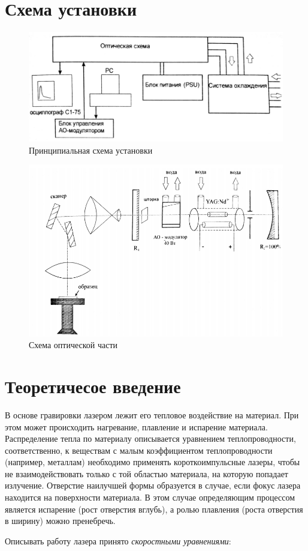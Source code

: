 \documentclass[a4paper, 12pt]{article}
\begin{document}
	\section{Схема установки}
	\begin{figure}[h!]
	\begin{center}
		\includegraphics[scale = 0.4]{sch1}
		\caption{Принципиальная схема установки}
		\label{ris:shem1}
	\end{center}	
	\end{figure}
	\begin{figure}[h!]
	\begin{center}
		\includegraphics[scale = 0.44]{sch2}
		\caption{Схема оптической части}
		\label{ris:shem2}
	\end{center}	
	\end{figure}
	\section{Теоретичесое введение}
	
	В основе гравировки лазером лежит его тепловое воздействие на материал. При этом может происходить нагревание, плавление и испарение материала. Распределение тепла по материалу описывается уравнением теплопроводности, соответственно, к веществам с малым коэффициентом теплопроводности (например, металлам) необходимо применять короткоимпульсные лазеры, чтобы не взаимодействовать только с той областью материала, на которую попадает излучение. Отверстие наилучшей формы образуется в случае, если фокус лазера находится на поверхности материала. В этом случае определяющим процессом является испарение (рост отверстия вглубь), а ролью плавления (роста отверстия в ширину) можно пренебречь.\par
Описывать работу лазера принято \textit{скоростными уравнениями}:
\end{document}
